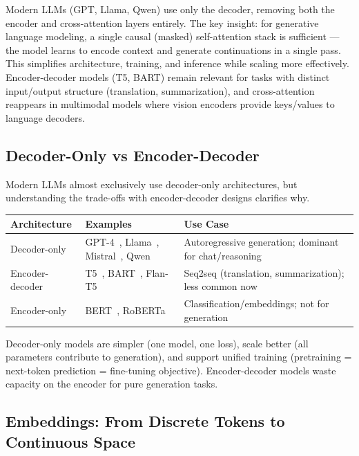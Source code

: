 Modern LLMs (GPT, Llama, Qwen) use only the decoder, removing both the encoder and cross-attention layers entirely. The key insight: for generative language modeling, a single causal (masked) self-attention stack is sufficient --- the model learns to encode context and generate continuations in a single pass. This simplifies architecture, training, and inference while scaling more effectively. Encoder-decoder models (T5, BART) remain relevant for tasks with distinct input/output structure (translation, summarization), and cross-attention reappears in multimodal models where vision encoders provide keys/values to language decoders.

\subsection{Decoder-Only vs Encoder-Decoder}
\label{decoder-only-vs-encoder-decoder}

Modern LLMs almost exclusively use decoder-only architectures, but understanding the trade-offs with encoder-decoder designs clarifies why.

\begin{tabular}{@{}lp{5cm}p{6.5cm}@{}}
\toprule
\textbf{Architecture} & \textbf{Examples} & \textbf{Use Case} \\
\midrule
Decoder-only & GPT-4~\cite{openai2023gpt4}, Llama~\cite{grattafiori2024llama3}, Mistral~\cite{jiang2023mistral}, Qwen~\cite{qwen2024qwen25} & Autoregressive generation; dominant for chat/reasoning \\
Encoder-decoder & T5~\cite{raffel2020t5}, BART~\cite{lewis2020bart}, Flan-T5~\cite{chung2022flan} & Seq2seq (translation, summarization); less common now \\
Encoder-only & BERT~\cite{devlin2019bert}, RoBERTa~\cite{liu2019roberta} & Classification/embeddings; not for generation \\
\bottomrule
\end{tabular}

\begin{warningbox}
Decoder-only models are simpler (one model, one loss), scale better (all parameters contribute to generation), and support unified training (pretraining = next-token prediction = fine-tuning objective). Encoder-decoder models waste capacity on the encoder for pure generation tasks.
\end{warningbox}

\subsection{Embeddings: From Discrete Tokens to Continuous Space}
\label{embeddings-from-discrete-tokens-to-continuous-space}

